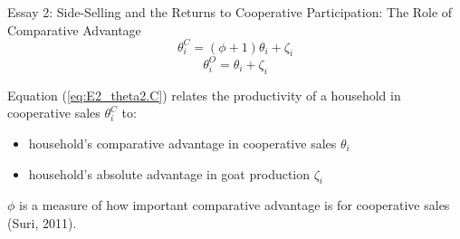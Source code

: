 \documentclass[aspectratio=169]{beamer}
\newenvironment{wideitemize}{\itemize\addtolength{\itemsep}{10pt}}{\enditemize}
\begin{document}
\begin{frame}{Essay 2: Side-Selling and the Returns to Cooperative Participation: The Role of Comparative Advantage}
    \begin{equation} \label{eq:E2_theta2.C}
        \theta^{C}_{i} = (\phi + 1)\theta_{i} + \zeta_i
    \end{equation}
    \begin{equation} \label{eq:E2_theta2.O}
        \theta^{O}_{i} = \theta_{i} + \zeta_i
    \end{equation}
    \begin{wideitemize}
        \item Equation (\ref{eq:E2_theta2.C}) relates the productivity of a household in cooperative sales $\theta^{C}_{i}$ to:
        \begin{itemize}
            \item household’s comparative advantage in cooperative sales $\theta_{i}$
            \item household’s absolute advantage in goat production $\zeta_i$
        \end{itemize} 
        \item $\phi$ is a measure of how important comparative advantage is for cooperative sales (Suri, 2011).
    \end{wideitemize}
\end{frame}
\end{document}
